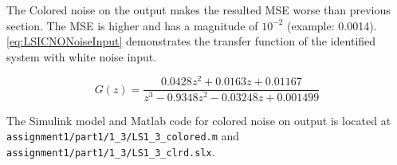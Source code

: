 The Colored noise on the output makes the resulted MSE worse than previous section. The MSE is higher and has a magnitude of $10^{-2}$ (example: 0.0014). \autoref{eq:LSICNONoiseInput} demonstrates the transfer function of the identified system with white noise input.

\begin{equation}
	G(z) =	\frac{0.0428 z^2 + 0.0163 z + 0.01167}{z^3 - 0.9348 z^2 - 0.03248 z + 0.001499}
	\label{eq:LSICNONoiseInput}
\end{equation}


The Simulink model and Matlab code for colored noise on output is located at  \hspace{-1ex}\lstinline| assignment1/part1/1_3/LS1_3_colored.m| and  \hspace{-1ex}\lstinline| assignment1/part1/1_3/LS1_3_clrd.slx|. 
